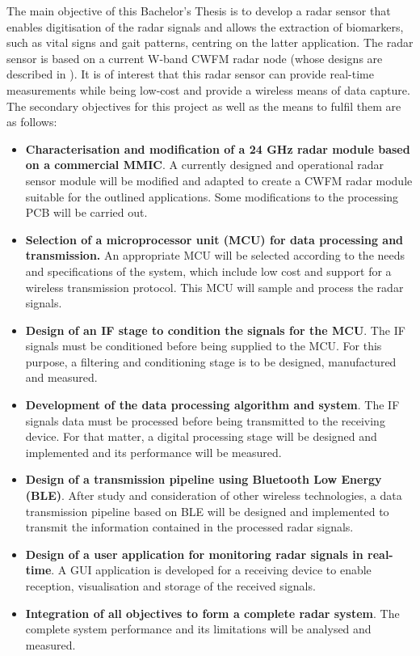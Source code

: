 	The main objective of this Bachelor's Thesis is to develop a radar sensor that enables digitisation of the radar signals and allows the extraction of biomarkers, such as vital signs and gait patterns, centring on the latter application. The radar sensor is based on a current W-band CWFM radar node (whose designs are described in \cite{Sardinero2022,Montesano2019}). It is of interest that this radar sensor can provide real-time measurements while being low-cost and provide a wireless means of data capture. The secondary objectives for this project as well as the means to fulfil them are as follows:
	\begin{itemize}
		\item \textbf{Characterisation and modification of a 24 GHz radar module based on a commercial MMIC}. A currently designed and operational radar sensor module will be modified and adapted to create a CWFM radar module suitable for the outlined applications. Some modifications to the processing PCB will be carried out.
		\item \textbf{Selection of a microprocessor unit (MCU) for data processing and transmission.} An appropriate MCU will be selected according to the needs and specifications of the system, which include low cost and support for a wireless transmission protocol. This MCU will sample and process the radar signals.
		\item \textbf{Design of an IF stage to condition the signals for the MCU}. The IF signals must be conditioned before being supplied to the MCU. For this purpose, a filtering and conditioning stage is to be designed, manufactured and measured.
		\item \textbf{Development of the data processing algorithm and system}. The IF signals data must be processed before being transmitted to the receiving device. For that matter, a digital processing stage will be designed and implemented and its performance will be measured.
		\item \textbf{Design of a transmission pipeline using Bluetooth Low Energy (BLE)}. After study and consideration of other wireless technologies, a data transmission pipeline based on BLE will be designed and implemented to transmit the information contained in the processed radar signals.
		\item \textbf{Design of a user application for monitoring radar signals in real-time}. A GUI application is developed for a receiving device to enable reception, visualisation and storage of the received signals.
		\item \textbf{Integration of all objectives to form a complete radar system}. The complete system performance and its limitations will be analysed and measured.
	\end{itemize}

